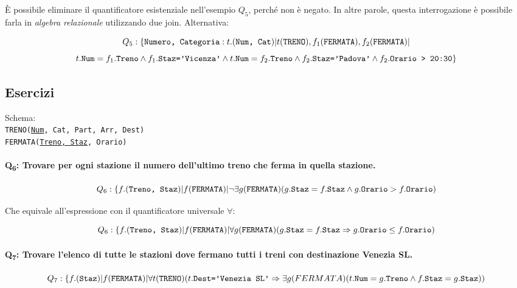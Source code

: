 \documentclass{report}
\begin{document}
\`E possibile eliminare il quantificatore esistenziale nell'esempio $Q_5$, perch\'e non \`e negato. In altre parole, questa interrogazione \`e possibile farla in \emph{algebra relazionale} utilizzando due join. Alternativa:

\[ Q_5: \{\text{\texttt{Numero, Categoria}}:t.(\text{\texttt{Num, Cat}})| t(\text{\texttt{TRENO}}), f_1(\text{\texttt{FERMATA}}), f_2(\text{\texttt{FERMATA}})| \]
\[ t.\text{\texttt{Num}} = f_1.\text{\texttt{Treno}}\wedge f_1.\text{\texttt{Staz='Vicenza'}} \wedge t.\text{\texttt{Num}} = f_2.\text{\texttt{Treno}} \wedge f_2.\text{\texttt{Staz='Padova'}} \wedge f_2.\text{\texttt{Orario > 20:30}}\} \]

\subsection{Esercizi}
Schema:\\
\texttt{TRENO(\underline{Num}, Cat, Part, Arr, Dest)\\
FERMATA(\underline{Treno, Staz}, Orario)}


\paragraph{Q\textsubscript{6}: Trovare per ogni stazione il numero dell'ultimo treno che ferma in quella stazione.}

\[ Q_6: \{f.(\text{\texttt{Treno, Staz}})| f(\text{\texttt{FERMATA}}) | \neg\exists g(\text{\texttt{FERMATA}}) (g.\text{\texttt{Staz}} = f.\text{\texttt{Staz}}\wedge g.\text{\texttt{Orario}} > f.\text{\texttt{Orario}} )\]

Che equivale all'espressione con il quantificatore universale $\forall$:


\[ Q_6: \{f.(\text{\texttt{Treno, Staz}})| f(\text{\texttt{FERMATA}}) | \forall g(\text{\texttt{FERMATA}}) (g.\text{\texttt{Staz}} = f.\text{\texttt{Staz}}\Rightarrow g.\text{\texttt{Orario}} \le f.\text{\texttt{Orario}} )\]



\paragraph{Q\textsubscript{7}: Trovare l'elenco di tutte le stazioni dove fermano tutti i treni con destinazione Venezia SL.}


\[ Q_7: \{f.(\text{\texttt{Staz}})| f(\text{\texttt{FERMATA}}) | \forall t(\text{\texttt{TRENO}}) (t.\text{\texttt{Dest='Venezia SL'}} \Rightarrow \exists g(FERMATA)(t.\text{\texttt{Num}} = g.\text{\texttt{Treno}} \wedge f.\text{\texttt{Staz}} = g.\text{\texttt{Staz}} ))\]
\end{document}
